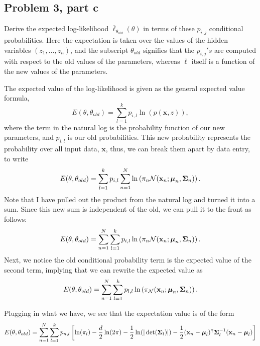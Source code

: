 \newcommand{\lbarthetaold}{\overline{\ell}_{\theta_{old}}(\theta)}

\newpage
\subsection{Problem 3, part c}
Derive the expected log-likelihood $\lbarthetaold$ in terms of these $p_{i, j}$ conditional probabilities. Here the expectation is taken over the values of the hidden variables $(z_1, ..., z_n)$, and the subscript $\theta_{old}$ signifies that the $p_{i, j}'s$ are computed with respect to the old values of the parameters, whereas $\overline{\ell}$ itself is a function of the new values of the parameters. 
\partbreak
\begin{solution}

    The expected value of the log-likelihood is given as the general expected value formula, 
    \[E (\theta, \theta_{old}) = \sum_{l = 1}^k p_{i, l}\ln\left(p(\textbf{x}, z)\right),\]
    where the term in the natural log is the probability function of our new parameters, and $p_{i, l}$ is our old probabilities. This new probability represents the probability over all input data, $\textbf{x}$, thus, we can break them apart by data entry, to write
    \[E (\theta, \theta_{old}) = \sum_{l = 1}^k p_{i, l}\sum_{n = 1}^N\ln\left(\pi_n\mathcal{N}(\textbf{x}_n; \boldsymbol{\mu}_n, \boldsymbol{\Sigma}_n)\right).\]
    Note that I have pulled out the product from the natural log and turned it into a sum. Since this new sum is independent of the old, we can pull it to the front as follows:
    \[E (\theta, \theta_{old}) = \sum_{n = 1}^N\sum_{l = 1}^k p_{i, l}\ln\left(\pi_n\mathcal{N}(\textbf{x}_n; \boldsymbol{\mu}_n, \boldsymbol{\Sigma}_n)\right).\]
    Next, we notice the old conditional probability term is the expected value of the second term, implying that we can rewrite the expected value as
    \[E(\theta, \theta_{old}) =  \sum_{n = 1}^N\sum_{l = 1}^k p_{l, l}\ln\left(\pi_{\mathcal{N}}(\textbf{x}_n; \boldsymbol{\mu}_n, \boldsymbol{\Sigma}_n)\right).\]

    Plugging in what we have, we see that the expectation value is of the form
    \[E(\theta, \theta_{old}) = \sum_{n = 1}^N\sum_{l = 1}^k p_{n, l} \left[ \ln(\pi_l) - \frac{d}{2}\ln (2\pi) - \frac{1}{2}\ln(|\det (\boldsymbol{\Sigma}_l)|) - \frac{1}{2}(\textbf{x}_n - \boldsymbol{\mu}_l)^{\intercal} \boldsymbol{\Sigma}^{-1}_l (\textbf{x}_n - \boldsymbol{\mu}_l)\right]\]
\end{solution}

\newpage
